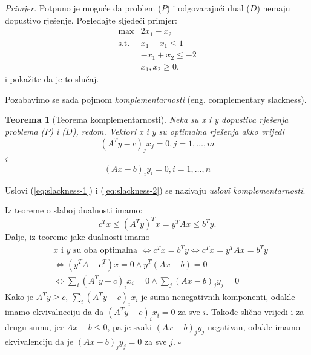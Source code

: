 \documentclass[a4paper, utf8, 11pt, colorlinks]{book}
\newtheorem{thm}{Teorema}
\newenvironment{proof}{{Dokaz:}}{\hfill$\square$}
\begin{document}
\emph{Primjer.} Potpuno je moguće da problem ($P$) i odgovarajući dual ($D$) nemaju dopustivo rješenje. Pogledajte sljedeći primjer:
$$\begin{array}{cc}
    \max                      & 2 x_1 - x_2 \\
     \mbox{s.t. }      & x_1 - x_1 \leq 1 \\
                              & -x_1 + x_2 \leq -2 \\
                             & x_1, x_2 \geq 0.
\end{array}$$
i pokažite da je to slučaj.

Pozabavimo se sada pojmom \emph{komplementarnosti} (eng. complementary slackness). 
\begin{thm}[Teorema komplementarnosti]
      Neka su x i y dopustiva rješenja problema ($P$) i  ($D$), redom. Vektori x i y su optimalna rješenja akko vrijedi 
      \begin{equation}\label{eq:slackness-1}
           (A^Ty - c)_j x_j = 0, j=1,\ldots,m
      \end{equation} i
      \begin{equation}\label{eq:slackness-2}
           (Ax - b)_i y_i = 0, i=1,\ldots,n
      \end{equation}
\end{thm}
Uslovi (\ref{eq:slackness-1}) i (\ref{eq:slackness-2}) se nazivaju \emph{uslovi komplementarnosti}.

\begin{proof}
         Iz teoreme o slaboj dualnosti imamo: 
         \begin{equation}
             c^Tx \leq ( A^T y)^T x = y^T A x \leq b^T y. 
         \end{equation}
         Dalje, iz teoreme jake dualnosti imamo  
         \begin{align*}
             &x \mbox{ i } y \mbox{ su oba optimalna } \Longleftrightarrow c^T x = b^T y \Longleftrightarrow c^Tx = y^TA x = b^Ty \\
             &\Longleftrightarrow (y^T A - c^T) x = 0 \wedge y^T(Ax - b )  = 0\\
             & \Longleftrightarrow \sum_i (A^T y - c)_i x_i = 0 \wedge \sum_j (Ax - b)_j y_j = 0
         \end{align*}
         Kako je $A^Ty \geq c$, $\sum_i (A^T y - c)_i x_i$ je suma nenegativnih komponenti, odakle imamo ekvivalneciju da  da   $(A^T y - c)_i x_i= 0$ za sve $i$. Takođe slično vrijedi i za drugu sumu, jer $Ax - b \leq 0$, pa je svaki  $(Ax - b)_j y_j$ negativan, odakle imamo ekvivalenciju da je $(Ax - b)_j y_j = 0$ za sve $j$.
\end{proof}
\end{document}
